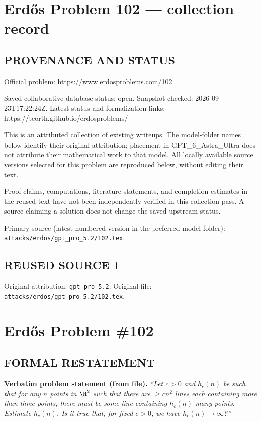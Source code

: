 \section*{Erd\H{o}s Problem 102 --- collection record}

\subsection*{PROVENANCE AND STATUS}
Official problem: https://www.erdosproblems.com/102

Saved collaborative-database status: open.
Snapshot checked: 2026-09-23T17:22:24Z.
Latest status and formalization links: https://teorth.github.io/erdosproblems/

This is an attributed collection of existing writeups. The model-folder names below identify their original attribution; placement in GPT\_6\_Astra\_Ultra does not attribute their mathematical work to that model. All locally available source versions selected for this problem are reproduced below, without editing their text.

Proof claims, computations, literature statements, and completion estimates in the reused text have not been independently verified in this collection pass. A source claiming a solution does not change the saved upstream status.

Primary source (latest numbered version in the preferred model folder): \texttt{attacks/erdos/gpt\_pro\_5.2/102.tex}.

\subsection*{REUSED SOURCE 1}
Original attribution: \texttt{gpt\_pro\_5.2}.
Original file: \texttt{attacks/erdos/gpt\_pro\_5.2/102.tex}.

\section*{Erd\H{o}s Problem \#102}

\subsection*{FORMAL RESTATEMENT}
\noindent\textbf{Verbatim problem statement (from file).}
\emph{``Let $c>0$ and $h_c(n)$ be such that for any $n$ points in $\R^2$ such that there are $\ge cn^2$ lines each containing more than three points, there must be some line containing $h_c(n)$ many points. Estimate $h_c(n)$. Is it true that, for fixed $c>0$, we have $h_c(n)\to\infty$?''}

